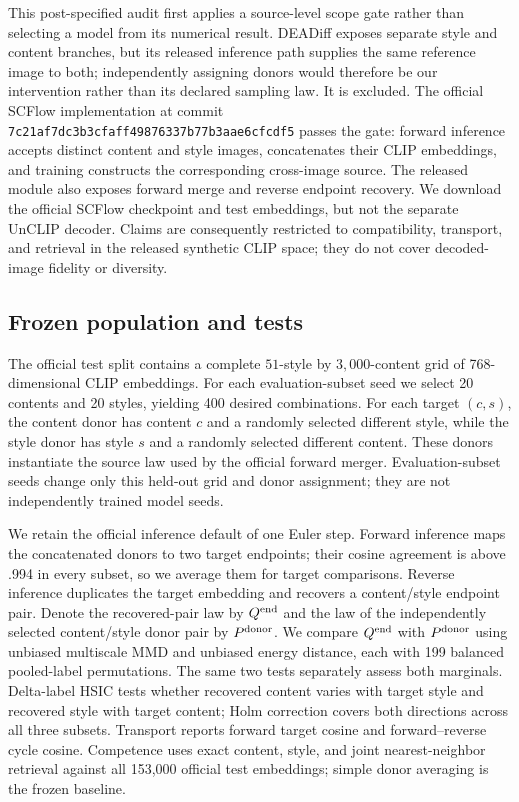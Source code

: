 This post-specified audit first applies a source-level scope gate rather than
selecting a model from its numerical result.  DEADiff exposes separate style
and content branches, but its released inference path supplies the same
reference image to both; independently assigning donors would therefore be our
intervention rather than its declared sampling law.  It is excluded.  The
official SCFlow implementation at commit
\texttt{7c21af7dc3b3cfaff49876337b77b3aae6cfcdf5} passes the gate: forward
inference accepts distinct content and style images, concatenates their CLIP
embeddings, and training constructs the corresponding cross-image source.
The released module also exposes forward merge and reverse endpoint recovery.
We download the official SCFlow checkpoint and test embeddings, but not the
separate UnCLIP decoder.  Claims are consequently restricted to compatibility,
transport, and retrieval in the released synthetic CLIP space; they do not
cover decoded-image fidelity or diversity.

\subsection{Frozen population and tests}

The official test split contains a complete $51$-style by $3{,}000$-content
grid of 768-dimensional CLIP embeddings.  For each evaluation-subset seed we
select 20 contents and 20 styles, yielding 400 desired combinations.  For each
target $(c,s)$, the content donor has content $c$ and a randomly selected
different style, while the style donor has style $s$ and a randomly selected
different content.  These donors instantiate the source law used by the
official forward merger.  Evaluation-subset seeds change only this held-out
grid and donor assignment; they are not independently trained model seeds.

We retain the official inference default of one Euler step.  Forward inference
maps the concatenated donors to two target endpoints; their cosine agreement is
above .994 in every subset, so we average them for target comparisons.  Reverse
inference duplicates the target embedding and recovers a content/style endpoint
pair.  Denote the recovered-pair law by $Q^{\rm end}$ and the law of the
independently selected content/style donor pair by $P^{\rm donor}$.  We compare
$Q^{\rm end}$ with $P^{\rm donor}$ using unbiased multiscale MMD and unbiased energy distance, each with 199
balanced pooled-label permutations.  The same two tests separately assess both
marginals.  Delta-label HSIC tests whether recovered content varies with target
style and recovered style with target content; Holm correction covers both
directions across all three subsets.  Transport reports forward target cosine
and forward--reverse cycle cosine.  Competence uses exact content, style, and
joint nearest-neighbor retrieval against all 153,000 official test embeddings;
simple donor averaging is the frozen baseline.

